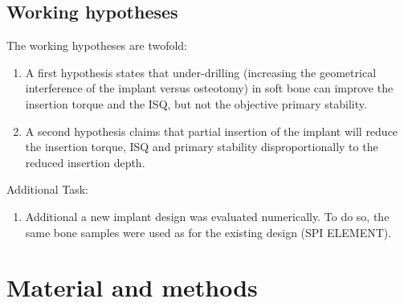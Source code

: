 \documentclass[12pt, a4paper, twoside]{report}
\begin{document}
\section{Working hypotheses}
%
The working hypotheses are twofold:
\begin{enumerate}
\item A first hypothesis states that under-drilling (increasing the geometrical interference of the implant versus osteotomy) in soft bone can improve the insertion torque and the ISQ, but not the objective primary stability.
\item A second hypothesis claims that partial insertion of the implant will reduce the insertion torque, ISQ and primary stability disproportionally to the reduced insertion depth.
\end{enumerate}
%
%
Additional Task:
\begin{enumerate}
\item Additional a new implant design was evaluated numerically. To do so, the same bone samples were used as for the existing design (SPI ELEMENT).
\end{enumerate}
%
%
%
%
%
%
%
\chapter{Material and methods}
%
%
%
\end{document}
